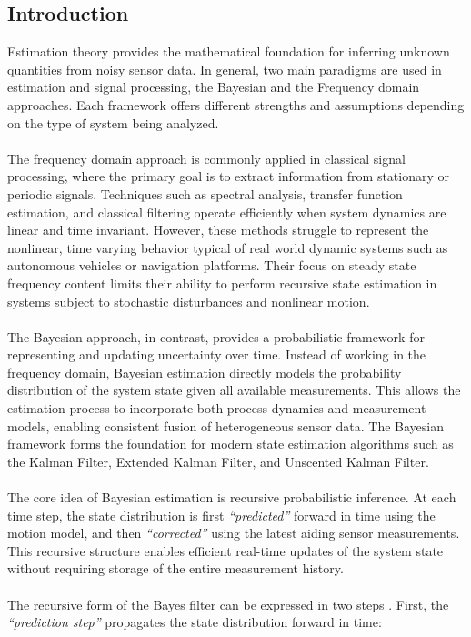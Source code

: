 \subsection{Introduction}
Estimation theory provides the mathematical foundation for inferring unknown quantities from noisy sensor data. In general, two main paradigms are used in estimation and signal processing, the Bayesian and the Frequency domain approaches. Each framework offers different strengths and assumptions depending on the type of system being analyzed.  
\\ \\
The frequency domain approach is commonly applied in classical signal processing, where the primary goal is to extract information from stationary or periodic signals. Techniques such as spectral analysis, transfer function estimation, and classical filtering operate efficiently when system dynamics are linear and time invariant. However, these methods struggle to represent the nonlinear, time varying behavior typical of real world dynamic systems such as autonomous vehicles or navigation platforms. Their focus on steady state frequency content limits their ability to perform recursive state estimation in systems subject to stochastic disturbances and nonlinear motion.  
\\ \\
The Bayesian approach, in contrast, provides a probabilistic framework for representing and updating uncertainty over time. Instead of working in the frequency domain, Bayesian estimation directly models the probability distribution of the system state given all available measurements. This allows the estimation process to incorporate both process dynamics and measurement models, enabling consistent fusion of heterogeneous sensor data. The Bayesian framework forms the foundation for modern state estimation algorithms such as the Kalman Filter, Extended Kalman Filter, and Unscented Kalman Filter.  
\\ \\
The core idea of Bayesian estimation is recursive probabilistic inference. At each time step, the state distribution is first \textit{``predicted''} forward in time using the motion model, and then \textit{``corrected''} using the latest aiding sensor measurements. This recursive structure enables efficient real-time updates of the system state without requiring storage of the entire measurement history. 
\\ \\
The recursive form of the Bayes filter can be expressed in two steps \cite{sensor_fusion_book}. First, the \textit{``prediction step''} propagates the state distribution forward in time:
